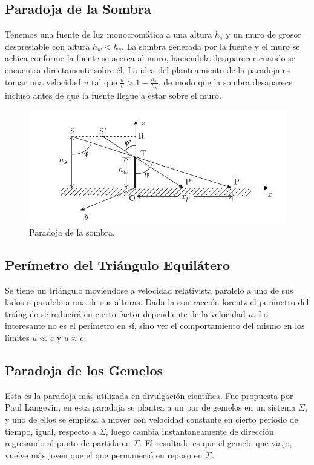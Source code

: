 \subsection{Paradoja de la Sombra}
Tenemos una fuente de luz monocromática a una altura $h_s$ y un muro de grosor despresiable con altura $h_w < h_s$. La sombra generada por la fuente y el muro se achica conforme la fuente se acerca al muro, haciendola desaparecer cuando se encuentra directamente sobre él. La idea del planteamiento de la paradoja es tomar una velocidad $u$ tal que $\frac{u}{c} > 1 - \frac{h_w}{h_s}$, de modo que la sombra desaparece incluso antes de que la fuente llegue a estar sobre el muro.

\begin{figure}[H]
	\centering
	\includegraphics[scale=0.5]{img/light.png}
	\caption{Paradoja de la sombra.}
	\label{shadow}
\end{figure}


\subsection{Perímetro del Triángulo Equilátero}
Se tiene un triángulo moviendose a velocidad relativista paralelo a uno de sus lados o paralelo a una de sus alturas. Dada la contracción lorentz el perímetro del triángulo se reducirá en cierto factor dependiente de la velocidad $u$. Lo interesante no es el perímetro en sí, sino ver el comportamiento del mismo en los límites $u \ll c$ y $u\approx c$.

\subsection{Paradoja de los Gemelos}
Esta es la paradoja más utilizada en divulgación científica. Fue propuesta por Paul Langevin, en esta paradoja se plantea a un par de gemelos en un sistema $\Sigma$, y uno de ellos se empieza a mover con velocidad constante en cierto periodo de tiempo, igual, respecto a $\Sigma$, luego cambia instantaneamente de dirección regresando al punto de partida en $\Sigma$. El resultado es que el gemelo que viajo, vuelve más joven que el que permaneció en reposo en $\Sigma$.














